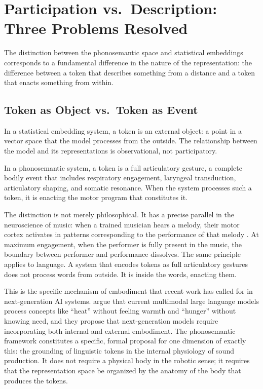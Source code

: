 \documentclass[12pt]{article}
\begin{document}
\section{Participation vs.\ Description: Three Problems Resolved}
\label{sec:participation}

The distinction between the phonosemantic space and statistical embeddings corresponds to a fundamental difference in the nature of the representation: the difference between a token that describes something from a distance and a token that enacts something from within.

\subsection{Token as Object vs.\ Token as Event}

In a statistical embedding system, a token is an external object: a point in a vector space that the model processes from the outside. The relationship between the model and its representations is observational, not participatory.

In a phonosemantic system, a token is a full articulatory gesture, a complete bodily event that includes respiratory engagement, laryngeal transduction, articulatory shaping, and somatic resonance. When the system processes such a token, it is enacting the motor program that constitutes it.

The distinction is not merely philosophical. It has a precise parallel in the neuroscience of music: when a trained musician hears a melody, their motor cortex activates in patterns corresponding to the performance of that melody \citep{haueisen2001}. At maximum engagement, when the performer is fully present in the music, the boundary between performer and performance dissolves. The same principle applies to language. A system that encodes tokens as full articulatory gestures does not process words from outside. It is inside the words, enacting them.

This is the specific mechanism of embodiment that recent work \citep{kadambi2025} has called for in next-generation AI systems. \citeauthor{kadambi2025} argue that current multimodal large language models process concepts like ``heat'' without feeling warmth and ``hunger'' without knowing need, and they propose that next-generation models require incorporating both internal and external embodiment. The phonosemantic framework constitutes a specific, formal proposal for one dimension of exactly this: the grounding of linguistic tokens in the internal physiology of sound production. It does not require a physical body in the robotic sense; it requires that the representation space be organized by the anatomy of the body that produces the tokens.
\end{document}
